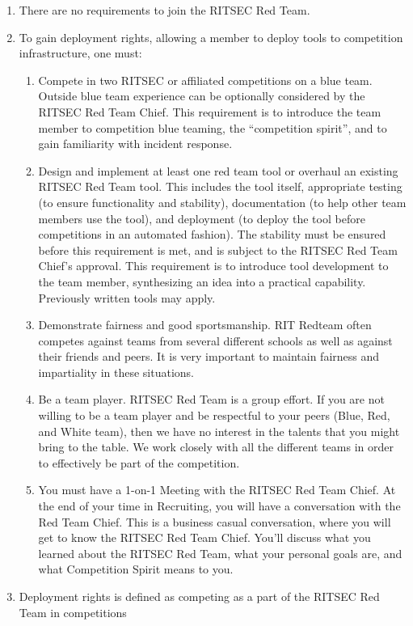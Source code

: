 \begin{enumerate}
	\item There are no requirements to join the RITSEC Red Team.
	\item To gain deployment rights, allowing a member to deploy tools to competition
	      infrastructure, one must:
	      \begin{enumerate}
		      \item Compete in two RITSEC or affiliated competitions on a blue team. Outside blue
		            team experience can be optionally considered by the RITSEC Red Team Chief. This
		            requirement is to introduce the team member to competition blue teaming, the
		            ``competition spirit'', and to gain familiarity with incident response.
		      \item Design and implement at least one red team tool or overhaul an existing RITSEC
		            Red Team tool. This includes the tool itself, appropriate testing (to ensure
		            functionality and stability), documentation (to help other team members use the
		            tool), and deployment (to deploy the tool before competitions in an automated
		            fashion). The stability must be ensured before this requirement is met, and is
		            subject to the RITSEC Red Team Chief's approval. This requirement is to
		            introduce tool development to the team member, synthesizing an idea into a
		            practical capability. Previously written tools may apply.
		      \item Demonstrate fairness and good sportsmanship. RIT Redteam often competes against
		            teams from several different schools as well as against their friends and
		            peers. It is very important to maintain fairness and impartiality in these
		            situations.
		      \item Be a team player. RITSEC Red Team is a group effort. If you are not willing to
		            be a team player and be respectful to your peers (Blue, Red, and White team),
		            then we have no interest in the talents that you might bring to the table. We
		            work closely with all the different teams in order to effectively be part of
		            the competition.
		      \item You must have a 1-on-1 Meeting with the RITSEC Red Team Chief. At the end of
		            your time in Recruiting, you will have a conversation with the Red Team Chief.
		            This is a business casual conversation, where you will get to know the RITSEC
		            Red Team Chief. You'll discuss what you learned about the RITSEC Red Team, what
		            your personal goals are, and what Competition Spirit means to you.
	      \end{enumerate}
	\item Deployment rights is defined as competing as a part of the RITSEC Red Team in
	      competitions
\end{enumerate}